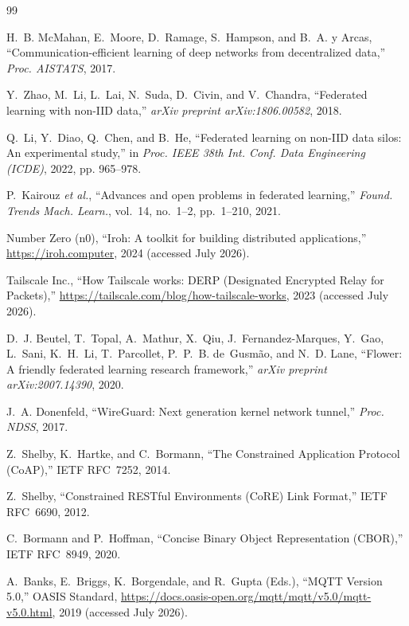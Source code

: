 \documentclass[a4paper,fleqn]{cas-dc}
\providecommand{\DIFaddend}{} %
\begin{document}
\DIFaddend \begin{thebibliography}{99}

H.~B. McMahan, E.~Moore, D.~Ramage, S.~Hampson, and B.~A. y Arcas,
``Communication-efficient learning of deep networks from decentralized data,''
\emph{Proc. AISTATS}, 2017.

Y.~Zhao, M.~Li, L.~Lai, N.~Suda, D.~Civin, and V.~Chandra,
``Federated learning with non-IID data,''
\emph{arXiv preprint arXiv:1806.00582}, 2018.

Q.~Li, Y.~Diao, Q.~Chen, and B.~He,
``Federated learning on non-IID data silos: An experimental study,''
in \emph{Proc. IEEE 38th Int. Conf. Data Engineering (ICDE)}, 2022, pp. 965--978.

P.~Kairouz \emph{et al.},
``Advances and open problems in federated learning,''
\emph{Found. Trends Mach. Learn.}, vol.~14, no.~1--2, pp.~1--210, 2021.

Number Zero (n0),
``Iroh: A toolkit for building distributed applications,''
\url{https://iroh.computer}, 2024 (accessed July 2026).

Tailscale Inc.,
``How Tailscale works: DERP (Designated Encrypted Relay for Packets),''
\url{https://tailscale.com/blog/how-tailscale-works}, 2023 (accessed July 2026).

D.~J. Beutel, T.~Topal, A.~Mathur, X.~Qiu, J.~Fernandez-Marques, Y.~Gao, L.~Sani, K.~H.~Li, T.~Parcollet, P.~P.~B. de~Gusm\~ao, and N.~D. Lane,
``Flower: A friendly federated learning research framework,''
\emph{arXiv preprint arXiv:2007.14390}, 2020.

J.~A. Donenfeld,
``WireGuard: Next generation kernel network tunnel,''
\emph{Proc. NDSS}, 2017.

Z.~Shelby, K.~Hartke, and C.~Bormann,
``The Constrained Application Protocol (CoAP),''
IETF RFC~7252, 2014.

Z.~Shelby,
``Constrained RESTful Environments (CoRE) Link Format,''
IETF RFC~6690, 2012.

C.~Bormann and P.~Hoffman,
``Concise Binary Object Representation (CBOR),''
IETF RFC~8949, 2020.

A.~Banks, E.~Briggs, K.~Borgendale, and R.~Gupta (Eds.),
``MQTT Version 5.0,''
OASIS Standard, \url{https://docs.oasis-open.org/mqtt/mqtt/v5.0/mqtt-v5.0.html}, 2019 (accessed July 2026).


\end{thebibliography}
\end{document}
